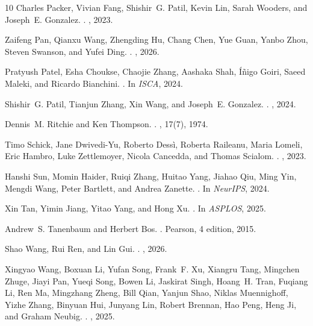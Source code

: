 \begin{thebibliography}{10}
Charles Packer, Vivian Fang, Shishir~G. Patil, Kevin Lin, Sarah Wooders, and
  Joseph~E. Gonzalez.
.
, 2023.

Zaifeng Pan, Qianxu Wang, Zhengding Hu, Chang Chen, Yue Guan, Yanbo Zhou,
  Steven Swanson, and Yufei Ding.
.
, 2026.

Pratyush Patel, Esha Choukse, Chaojie Zhang, Aashaka Shah, {\'I}{\~n}igo Goiri,
  Saeed Maleki, and Ricardo Bianchini.
.
\newblock In {\em ISCA}, 2024.

Shishir~G. Patil, Tianjun Zhang, Xin Wang, and Joseph~E. Gonzalez.
.
, 2024.

Dennis~M. Ritchie and Ken Thompson.
.
, 17(7), 1974.

Timo Schick, Jane Dwivedi-Yu, Roberto Dess{\`i}, Roberta Raileanu, Maria
  Lomeli, Eric Hambro, Luke Zettlemoyer, Nicola Cancedda, and Thomas Scialom.
.
, 2023.

Hanshi Sun, Momin Haider, Ruiqi Zhang, Huitao Yang, Jiahao Qiu, Ming Yin,
  Mengdi Wang, Peter Bartlett, and Andrea Zanette.
.
\newblock In {\em NeurIPS}, 2024.

Xin Tan, Yimin Jiang, Yitao Yang, and Hong Xu.
.
\newblock In {\em ASPLOS}, 2025.

Andrew~S. Tanenbaum and Herbert Bos.
.
\newblock Pearson, 4 edition, 2015.

Shao Wang, Rui Ren, and Lin Gui.
.
, 2026.

Xingyao Wang, Boxuan Li, Yufan Song, Frank~F. Xu, Xiangru Tang, Mingchen Zhuge,
  Jiayi Pan, Yueqi Song, Bowen Li, Jaskirat Singh, Hoang~H. Tran, Fuqiang Li,
  Ren Ma, Mingzhang Zheng, Bill Qian, Yanjun Shao, Niklas Muennighoff, Yizhe
  Zhang, Binyuan Hui, Junyang Lin, Robert Brennan, Hao Peng, Heng Ji, and
  Graham Neubig.
.
, 2025.


\end{thebibliography}
